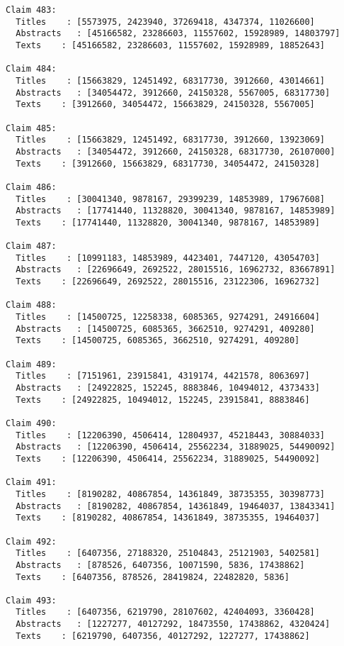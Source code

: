 \documentclass[11pt]{article}
\begin{document}
\begin{Verbatim}[commandchars=\\\{\}]
Claim 483:
  Titles    : [5573975, 2423940, 37269418, 4347374, 11026600]
  Abstracts   : [45166582, 23286603, 11557602, 15928989, 14803797]
  Texts    : [45166582, 23286603, 11557602, 15928989, 18852643]

Claim 484:
  Titles    : [15663829, 12451492, 68317730, 3912660, 43014661]
  Abstracts   : [34054472, 3912660, 24150328, 5567005, 68317730]
  Texts    : [3912660, 34054472, 15663829, 24150328, 5567005]

Claim 485:
  Titles    : [15663829, 12451492, 68317730, 3912660, 13923069]
  Abstracts   : [34054472, 3912660, 24150328, 68317730, 26107000]
  Texts    : [3912660, 15663829, 68317730, 34054472, 24150328]

Claim 486:
  Titles    : [30041340, 9878167, 29399239, 14853989, 17967608]
  Abstracts   : [17741440, 11328820, 30041340, 9878167, 14853989]
  Texts    : [17741440, 11328820, 30041340, 9878167, 14853989]

Claim 487:
  Titles    : [10991183, 14853989, 4423401, 7447120, 43054703]
  Abstracts   : [22696649, 2692522, 28015516, 16962732, 83667891]
  Texts    : [22696649, 2692522, 28015516, 23122306, 16962732]

Claim 488:
  Titles    : [14500725, 12258338, 6085365, 9274291, 24916604]
  Abstracts   : [14500725, 6085365, 3662510, 9274291, 409280]
  Texts    : [14500725, 6085365, 3662510, 9274291, 409280]

Claim 489:
  Titles    : [7151961, 23915841, 4319174, 4421578, 8063697]
  Abstracts   : [24922825, 152245, 8883846, 10494012, 4373433]
  Texts    : [24922825, 10494012, 152245, 23915841, 8883846]

Claim 490:
  Titles    : [12206390, 4506414, 12804937, 45218443, 30884033]
  Abstracts   : [12206390, 4506414, 25562234, 31889025, 54490092]
  Texts    : [12206390, 4506414, 25562234, 31889025, 54490092]

Claim 491:
  Titles    : [8190282, 40867854, 14361849, 38735355, 30398773]
  Abstracts   : [8190282, 40867854, 14361849, 19464037, 13843341]
  Texts    : [8190282, 40867854, 14361849, 38735355, 19464037]

Claim 492:
  Titles    : [6407356, 27188320, 25104843, 25121903, 5402581]
  Abstracts   : [878526, 6407356, 10071590, 5836, 17438862]
  Texts    : [6407356, 878526, 28419824, 22482820, 5836]

Claim 493:
  Titles    : [6407356, 6219790, 28107602, 42404093, 3360428]
  Abstracts   : [1227277, 40127292, 18473550, 17438862, 4320424]
  Texts    : [6219790, 6407356, 40127292, 1227277, 17438862]


\end{Verbatim}
\end{document}
